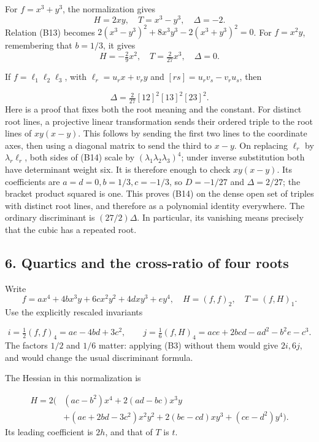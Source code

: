 \documentclass[
]{article}
\begin{document}
For \(f=x^3+y^3\), the normalization gives \[
H=2xy,\quad T=x^3-y^3,\quad \Delta=-2.
\] Relation (B13) becomes \(2(x^3-y^3)^2+8x^3y^3-2(x^3+y^3)^2=0\). For
\(f=x^2y\), remembering that \(b=1/3\), it gives \[
H=-\tfrac29x^2,\quad T=\tfrac2{27}x^3,\quad\Delta=0.
\]

If \(f=\ell_1\ell_2\ell_3\), with \(\ell_r=u_rx+v_ry\) and
\([rs]=u_rv_s-v_ru_s\), then
\protect{}\label{equation-B14}{}

\[
\Delta=\tfrac2{27}[12]^2 [13]^2 [23]^2.
\tag{B14}
\] Here is a proof that fixes both the root meaning and the constant.
For distinct root lines, a projective linear transformation sends their
ordered triple to the root lines of \(xy(x-y)\). This follows by sending
the first two lines to the coordinate axes, then using a diagonal matrix
to send the third to \(x-y\). On replacing \(\ell_r\) by
\(\lambda_r\ell_r\), both sides of (B14) scale by
\((\lambda_1\lambda_2\lambda_3)^4\); under inverse substitution both
have determinant weight six. It is therefore enough to check
\(xy(x-y)\). Its coefficients are \(a=d=0,b=1/3,c=-1/3\), so \(D=-1/27\)
and \(\Delta=2/27\); the bracket product squared is one. This proves
(B14) on the dense open set of triples with distinct root lines, and
therefore as a polynomial identity everywhere. The ordinary discriminant
is \((27/2)\Delta\). In particular, its vanishing means precisely that
the cubic has a repeated root.

\subsection{6. Quartics and the cross-ratio of four
roots}\label{section-6}

Write \[
f=ax^4+4bx^3y+6cx^2y^2+4dxy^3+ey^4,\quad
H=(f,f)_2,\quad T=(f,H)_1.
\] Use the explicitly rescaled invariants
\protect{}\label{equation-B15}{}

\[
i=\tfrac12(f,f)_4=ae-4bd+3c^2,\qquad
j=\tfrac16(f,H)_4=ace+2bcd-ad^2-b^2e-c^3.
\tag{B15}
\] The factors \(1/2\) and \(1/6\) matter: applying (B3) without them
would give \(2i,6j\), and would change the usual discriminant formula.

The Hessian in this normalization is
\protect{}\label{equation-B16}{}

\[
\begin{split}
H=2\bigl(& (ac-b^2)x^4+2(ad-bc)x^3y\\
&+(ae+2bd-3c^2)x^2y^2
+2(be-cd)xy^3+(ce-d^2)y^4\bigr).
\end{split}
\tag{B16}
\] Its leading coefficient is \(2h\), and that of \(T\) is \(t\).
\end{document}
